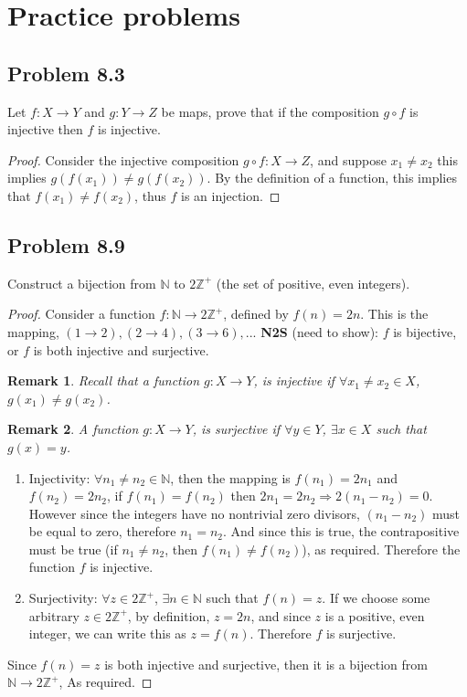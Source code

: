 \documentclass[12pt]{article}
\title{\scalebox{2}{Math 341 Homework 8}}
\author{\scalebox{1.5}{Theo Koss}}
\date{October 2020}
\newtheorem*{remark}{Remark}
\newcommand{\N}{\mathbb{N}}
\newcommand{\Z}{\mathbb{Z}}
\begin{document}
\maketitle
\section{Practice problems}
\subsection{Problem 8.3}
Let $f:X\to Y$ and $g:Y\to Z$ be maps, prove that if the composition $g\circ f$ is injective then $f$ is injective.
\begin{proof}
\newline Consider the injective composition $g\circ f:X\to Z$, and suppose $x_1\neq x_2$ this implies $g(f(x_1))\neq g(f(x_2))$. By the definition of a function, this implies that $f(x_1)\neq f(x_2)$, thus $f$ is an injection.
\end{proof}
\subsection{Problem 8.9}
Construct a bijection from $\N$ to $2\Z^+$ (the set of positive, even integers).
\begin{proof}
Consider a function $f:\N\to2\Z^+$, defined by $f(n)=2n$. This is the mapping, $(1\to2), (2\to4),(3\to6),...$
\newline \textbf{N2S} (need to show): $f$ is bijective, or $f$ is both injective and surjective.
\begin{remark}
Recall that a function $g:X\to Y$, is injective if $\forall x_1\neq x_2\in X$, $g(x_1)\neq g(x_2)$.\end{remark}
\begin{remark}
A function $g:X\to Y$, is surjective if $\forall y\in Y$, $\exists x\in X$ such that $g(x)=y$.\end{remark}
\begin{enumerate}
    \item Injectivity: $\forall n_1\neq n_2\in\N$, then the mapping is $f(n_1)=2n_1$ and $f(n_2)=2n_2$, if $f(n_1)=f(n_2)$ then $2n_1=2n_2\Longrightarrow2(n_1-n_2)=0$. However since the integers have no nontrivial zero divisors, $(n_1-n_2)$ must be equal to zero, therefore $n_1=n_2$. And since this is true, the contrapositive must be true (if $n_1\neq n_2$, then $f(n_1)\neq f(n_2)$), as required. Therefore the function $f$ is injective.
    \item Surjectivity: $\forall z\in 2\Z^+$, $\exists n\in\N$ such that $f(n)=z$. If we choose some arbitrary $z\in2\Z^+$, by definition, $z=2n$, and since $z$ is a positive, even integer, we can write this as $z=f(n)$. Therefore $f$ is surjective.
\end{enumerate}
\newline Since $f(n)=z$ is both injective and surjective, then it is a bijection from $\N\to2\Z^+$, As required.
\end{proof}
\end{document}

